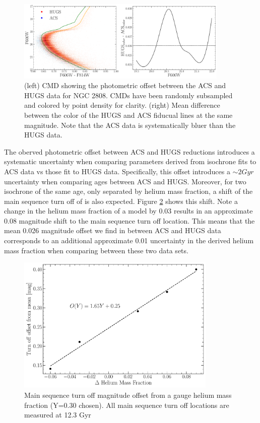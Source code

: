 \begin{figure}
  \centering
  \includegraphics[width=0.90\textwidth]{figures/ngc2808/photometricOffset.pdf}
  \caption{(left) CMD showing the photometric offset between the ACS and HUGS
  data for NGC 2808. CMDs have been randomly subsampled and colored by point
  density for clarity. (right) Mean difference between the color of the HUGS
  and ACS fiducual lines at the same magnitude. Note that the ACS data is
  systematically bluer than the HUGS data.}
  \label{fig:offset}
\end{figure}

The oberved photometric offset between ACS and HUGS reductions introduces a
systematic uncertainty when comparing parameters derived from isochrone fits
to ACS data vs those fit to HUGS data. Specifically, this offset introduces a
$\sim 2 Gyr$ uncertainty when comparing ages between ACS and HUGS. Moreover,
for two isochrone of the same age, only separated by helium mass fraction, a
shift of the main sequence turn off of is also expected. Figure \ref{fig:HeMO}
shows this shift. Note a change in the helium mass fraction of a model by 0.03
results in an approximate 0.08 magnitude shift to the main sequence turn off
location. This means that the mean 0.026 magnitude offset we find in between
ACS and HUGS data corresponds to an additional approximate 0.01 uncertainty
in the derived helium mass fraction when comparing between these two data sets. 

\begin{figure}
  \centering
  \includegraphics[width=0.85\textwidth]{figures/ngc2808/HeliumMeanOffset.pdf}
  \caption{Main sequence turn off magnitude offset from a gauge helium mass
  fraction (Y=0.30 chosen). All main sequence turn off locations are measured
  at 12.3 Gyr}
  \label{fig:HeMO}
\end{figure}
